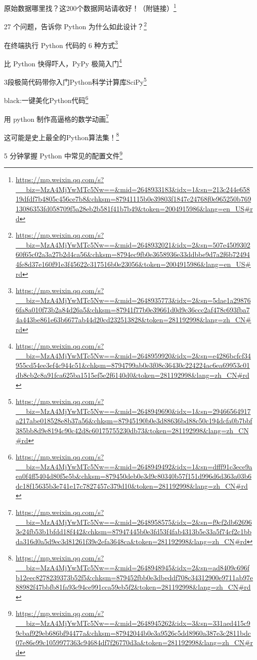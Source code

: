 \documentclass[]{ctexbook}
\renewcommand{\href}[2]{#2\footnote{\url{#1}}}
\begin{document}
\href{https://mp.weixin.qq.com/s?__biz=MzA4MjYwMTc5Nw==\&mid=2648933183\&idx=1\&sn=213c244e65819dfdf7b4805c456ce7b8\&chksm=87941115b0e39803f1847c24768f0e965250b76913086353fd058709f5a28eb2b581f41b7b49\&token=2004915986\&lang=en_US\#rd}{原始数据哪里找？这200个数据网站请收好！（附链接）}

\href{https://mp.weixin.qq.com/s?__biz=MzA4MjYwMTc5Nw==\&mid=2648932021\&idx=2\&sn=507e450930260f65c02a3a27b2d4ca56\&chksm=8794ec9fb0e3658936e33ddbbe9d7a2f6b724944fe8d37e160f91e3f45622c317516b0e23056\&token=2004915986\&lang=en_US\#rd}{27 个问题，告诉你 Python 为什么如此设计？}

\href{https://mp.weixin.qq.com/s?__biz=MzA4MjYwMTc5Nw==\&mid=2648935773\&idx=2\&sn=5dae1a298766fa8a010f73b2a84d26a5\&chksm=87941f77b0e39661d0d9c36ccc2af478c693fba74a443be861e63b6677ab44d20cd232513828\&token=281192998\&lang=zh_CN\#rd}{在终端执行 Python 代码的 6 种方式}

\href{https://mp.weixin.qq.com/s?__biz=MzA4MjYwMTc5Nw==\&mid=2648959920\&idx=2\&sn=e4286bcfcf34955cd54ee3ef4c944c51\&chksm=8794799ab0e3f08c36430c224224ac6ea69953c01db8cb2c8a91fca625ba1515ef5e2f6140d0\&token=281192998\&lang=zh_CN\#rd}{比 Python 快得吓人，PyPy 极简入门}

\href{https://mp.weixin.qq.com/s?__biz=MzA4MjYwMTc5Nw==\&mid=2648949690\&idx=1\&sn=29466564917a217abe018528e8b37a56\&chksm=87945190b0e3d88636bd88c50c194dcfa0b7bbf385bb8d9e8194c90c42d8c60175755230db73\&token=281192998\&lang=zh_CN\#rd}{3段极简代码带你入门Python科学计算库SciPy}

\href{https://mp.weixin.qq.com/s?__biz=MzA4MjYwMTc5Nw==\&mid=2648949492\&idx=1\&sn=dfff91c3ece9aea0f4ff5404d80f5e5b\&chksm=879450deb0e3d9c80340b57f151d996d6d363a03b6dc18f15635b3e741e17c7827457c379d10\&token=281192998\&lang=zh_CN\#rd}{black:一键美化Python代码}

\href{https://mp.weixin.qq.com/s?__biz=MzA4MjYwMTc5Nw==\&mid=2648958575\&idx=2\&sn=f9cf2db626963e24fb53b1bfdd18f442\&chksm=87947445b0e3fd53f4fab4313b5e33a5f74cf2c1bbda316d0a5d9ec3d81261f39e2efa3648ca\&token=281192998\&lang=zh_CN\#rd}{用 python 制作高逼格的数学动画}

\href{https://mp.weixin.qq.com/s?__biz=MzA4MjYwMTc5Nw==\&mid=2648948945\&idx=2\&sn=ad8409c696fb12eec8278239373b52f5\&chksm=879452fbb0e3dbeddf708c34312900e9711ab97e88982f47bbfb81fa93c94ce991cca59eb5f2\&token=281192998\&lang=zh_CN\#rd}{这可能是史上最全的Python算法集！}

\href{https://mp.weixin.qq.com/s?__biz=MzA4MjYwMTc5Nw==\&mid=2648945262\&idx=3\&sn=331aed415c99cbaf929eb686bf94477a\&chksm=87942044b0e3a9526c5dd8960a387e3c2811bdc07e86e99c1059977363c94684df7f26770d3a\&token=281192998\&lang=zh_CN\#rd}{5 分钟掌握 Python 中常见的配置文件}
\end{document}
